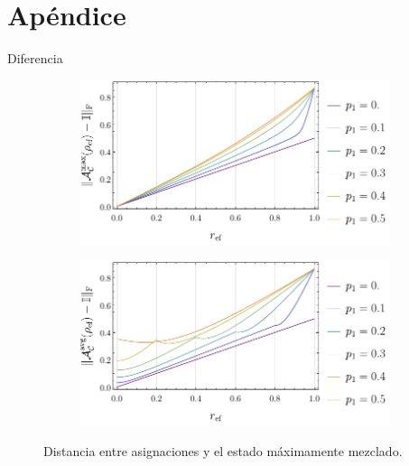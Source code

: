 \section{Apéndice}
\begin{frame}{Diferencia}
    \begin{figure}[ht!]
        \centering
        \begin{subfigure}{.45\textwidth}
          \centering
          \includegraphics[width=1.\linewidth]{figures/avg_results/dist_maxent_or_vs_p.pdf}
        \end{subfigure}%
        \begin{subfigure}{.45\textwidth}
          \centering
          \includegraphics[width=1.\linewidth]{figures/avg_results/dist_avg_or_vs_p.pdf}
        \end{subfigure}
        \caption{Distancia entre asignaciones y el estado máximamente mezclado.}
    \end{figure}
\end{frame}